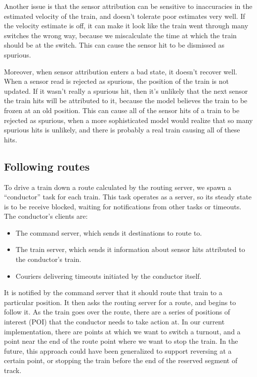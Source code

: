 \documentclass{article}
\begin{document}
Another issue is that the sensor attribution can be sensitive to inaccuracies in the estimated velocity of the train,
and doesn't tolerate poor estimates very well.
If the velocity estimate is off, it can make it look like the train went through many switches the wrong way, because
we miscalculate the time at which the train should be at the switch.
This can cause the sensor hit to be dismissed as spurious.

Moreover, when sensor attribution enters a bad state, it doesn't recover well.
When a sensor read is rejected as spurious, the position of the train is not updated.
If it wasn't really a spurious hit, then it's unlikely that the next sensor the train hits
will be attributed to it, because the model believes the train to be frozen at an old position.
This can cause all of the sensor hits of a train to be rejected as spurious, when a more sophisticated
model would realize that so many spurious hits is unlikely, and there is probably a real train
causing all of these hits.

\subsection{Following routes}
To drive a train down a route calculated by the routing server, we spawn a ``conductor'' task for each train.
This task operates as a server, so its steady state is to be receive blocked,
waiting for notifications from other tasks or timeouts.
The conductor's clients are:

\begin{itemize}
\item The command server, which sends it destinations to route to.
\item The train server, which sends it information about sensor hits attributed
to the conductor's train.
\item Couriers delivering timeouts initiated by the conductor itself.
\end{itemize}

It is notified by the command server that it should route that train to a particular position.
It then asks the routing server for a route, and begins to follow it.
As the train goes over the route, there are a series of positions of interest (POI) that the conductor needs to take
action at.
In our current implementation, there are points at which we want to switch a turnout,
and a point near the end of the route point where we want to stop the train.
In the future, this approach could have been generalized to support reversing at a certain point,
or stopping the train before the end of the reserved segment of track.
\end{document}
